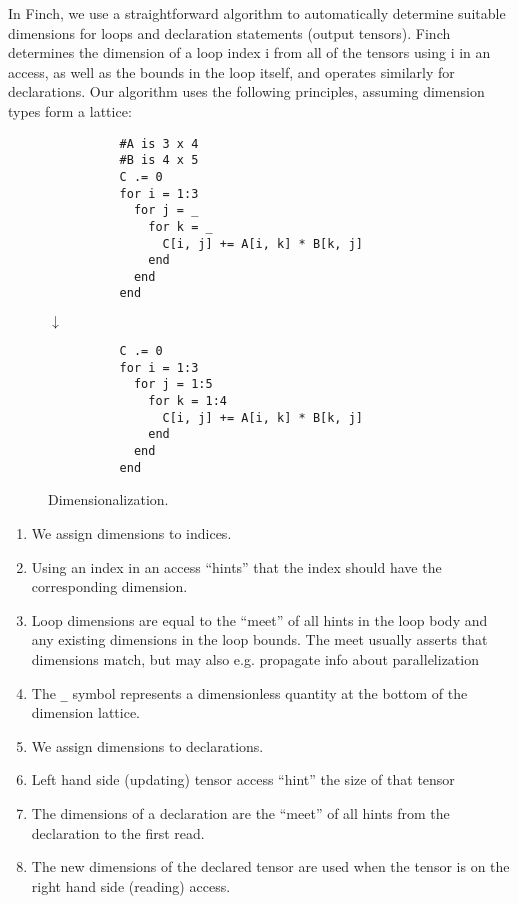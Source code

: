     
    In Finch, we use a straightforward algorithm to automatically determine suitable dimensions for loops and declaration statements (output tensors).
    Finch determines the dimension of a loop index i from all of the tensors using i in an access, as well as the bounds in the loop itself, and operates similarly for declarations.
    Our algorithm uses the following principles, assuming dimension types form a lattice:
    \begin{wrapfigure}{r}{0.25\textwidth}
        \begin{verbatim}
          #A is 3 x 4
          #B is 4 x 5
          C .= 0
          for i = 1:3
            for j = _
              for k = _
                C[i, j] += A[i, k] * B[k, j]
              end
            end
          end
        \end{verbatim}
        $\downarrow$
        \begin{verbatim}
          C .= 0
          for i = 1:3
            for j = 1:5
              for k = 1:4
                C[i, j] += A[i, k] * B[k, j]
              end
            end
          end
        \end{verbatim}
        \caption{Dimensionalization.}\label{fig:dimensionalization}
    \end{wrapfigure}
    \begin{enumerate}
        \item We assign dimensions to indices.
        \item Using an index in an access “hints” that the index should have the corresponding dimension.
        \item Loop dimensions are equal to the “meet” of all hints in the loop body
        and any existing dimensions in the loop bounds. The meet usually asserts
        that dimensions match, but may also e.g. propagate info about parallelization
        \item The \texttt{_} symbol represents a dimensionless quantity at the bottom of the dimension lattice.
        \item We assign dimensions to declarations.
        \item Left hand side (updating) tensor access “hint” the size of that tensor
        \item The dimensions of a declaration are the “meet” of all hints from
        the declaration to the first read.
        \item The new dimensions of the declared tensor are used when the tensor is on the right hand side (reading)
        access.
    \end{enumerate}

